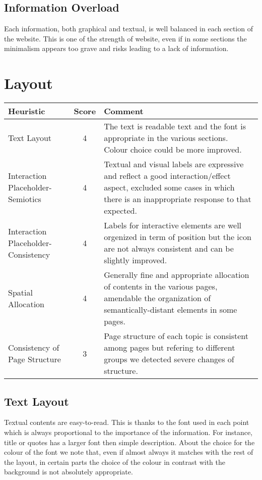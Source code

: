 \subsection{Information Overload}
Each information, both graphical and textual, is well balanced in each section of the website. This is one of the strength of website, even if in some sections the minimalism appears too grave and risks leading to a lack of information.

\section{Layout}

\begin{table}[H]
  \begin{center}
    \label{tab:table1}
    \begin{tabular}{||l|c|p{8cm}||} %
      \textbf{Heuristic} & \textbf{Score} & \textbf{Comment}\\
      
      \hline
      Text Layout & 4 & The text is readable text and the font is appropriate in the various sections. Colour choice could be more improved.\\
      \hline
      Interaction Placeholder-Semiotics & 4 & Textual and visual labels are expressive and reflect a good interaction/effect aspect, excluded some cases in which there is an inappropriate response to that expected.\\
      \hline
      Interaction Placeholder-Consistency & 4 & Labels for interactive elements are well orgenized in term of position but the icon are not always consistent and can be slightly improved.\\
      \hline
      Spatial Allocation & 4 & Generally fine and appropriate allocation of contents in the various pages, amendable the organization of semantically-distant elements in some pages.\\
      \hline
      Consistency of Page Structure & 3 & Page structure of each topic is consistent among pages but refering to different groups we detected severe changes of structure.\\

    \end{tabular}
  \end{center}
\end{table}

\subsection{Text Layout}
Textual contents are easy-to-read. This is thanks to the font used in each point which is always proportional to the importance of the information. For instance, title or quotes has a larger font then simple description. About the choice for the colour of the font we note that, even if almost always it matches with the rest of the layout, in certain parts the choice of the colour in contrast with the background is not absolutely appropriate.
